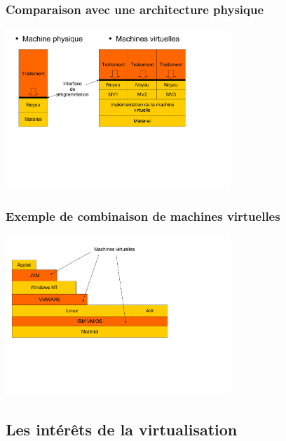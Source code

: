 \begin{frame}
\frametitle{Comparaison avec une architecture physique}
\includegraphics[height=6cm]{../illustration/compar_mp_mvirt.pdf}
\end{frame}

\begin{frame}
\frametitle{Exemple de combinaison de machines virtuelles}
\includegraphics[height=6cm]{../illustration/exemple_mv.pdf}
\end{frame}

\subsection{Les intérêts de la virtualisation}

